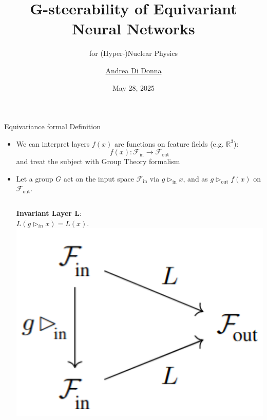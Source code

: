 \documentclass[aspectratio=64,8pt]{beamer}
\title{G-steerability of Equivariant Neural Networks}
\subtitle{for (Hyper-)Nuclear Physics}
\author{\href{mailto:andrea.didonna@unitn.it}{Andrea Di Donna}}
\date{May 28, 2025}
\begin{document}
\frame{\titlepage}


\begin{frame}{Equivariance formal Definition}
    \begin{itemize}
      \item We can interpret layers \(f(x)\) are \alert{functions} on feature fields (e.g. $\mathbb{R}^3$):
      \begin{equation}\nonumber
        f(x):\mathcal{F}_{\textrm{in}}\to\mathcal{F}_{\textrm{out}}
      \end{equation}
      and treat the subject with Group Theory formalism
      \item Let a group $G$ act on the input space $\mathcal{F}_{\mathrm{in}}$ via $g\rhd_{\textrm{in}} x$, and as $g\rhd_{\textrm{out}}f(x)$ on $\mathcal{F}_{\textrm{out}}$.
      \begin{columns}
        \begin{column}{0.25\linewidth}
        \begin{center}

          \textbf{Invariant Layer L}: 
          \\$L(g\rhd_{in}x)=L(x)$.
          \includegraphics[width=1\textwidth]{Immagini/Invariance.png}
        \end{center}          
        \end{column}


\end{columns}
\end{itemize}
\end{frame}
\end{document}
